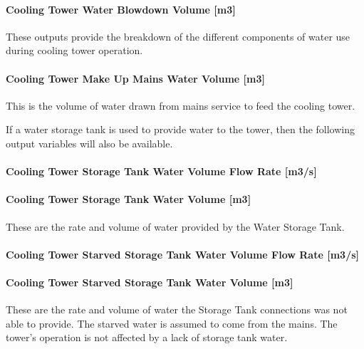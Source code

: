 \paragraph{Cooling Tower Water Blowdown Volume {[}m3{]}}\label{cooling-tower-water-blowdown-volume-m3}

These outputs provide the breakdown of the different components of water use during cooling tower operation.

\paragraph{Cooling Tower Make Up Mains Water Volume {[}m3{]}}\label{cooling-tower-make-up-mains-water-volume-m3}

This is the volume of water drawn from mains service to feed the cooling tower.

If a water storage tank is used to provide water to the tower, then the following output variables will also be available.

\paragraph{Cooling Tower Storage Tank Water Volume Flow Rate {[}m3/s{]}}\label{cooling-tower-storage-tank-water-volume-flow-rate-m3s}

\paragraph{Cooling Tower Storage Tank Water Volume {[}m3{]}}\label{cooling-tower-storage-tank-water-volume-m3}

These are the rate and volume of water provided by the Water Storage Tank.

\paragraph{Cooling Tower Starved Storage Tank Water Volume Flow Rate {[}m3/s{]}}\label{cooling-tower-starved-storage-tank-water-volume-flow-rate-m3s}

\paragraph{Cooling Tower Starved Storage Tank Water Volume {[}m3{]}}\label{cooling-tower-starved-storage-tank-water-volume-m3}

These are the rate and volume of water the Storage Tank connections was not able to provide. The starved water is assumed to come from the mains. The tower's operation is not affected by a lack of storage tank water.

